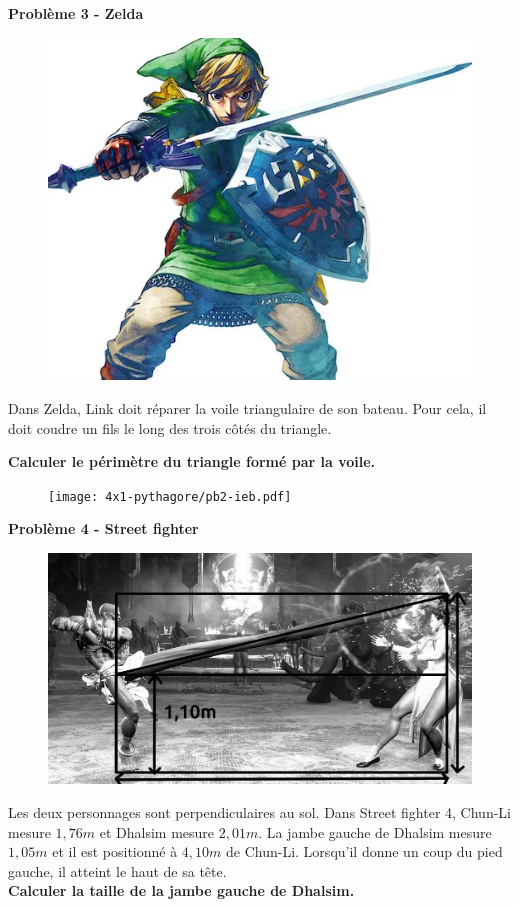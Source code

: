 \begin{multicols}{2} 
  \textbf{Problème 3 - Zelda} \\

  \begin{figure}[H]
    \centering
    \includegraphics[width=0.5\linewidth]{4x1-pythagore/pb1-link.png}
  \end{figure}

  Dans Zelda, Link doit réparer la voile triangulaire de son bateau. Pour cela, il doit coudre un fils le long des trois côtés du triangle. 

  \textbf{Calculer le périmètre du triangle formé par la voile.} \columnbreak

  \begin{figure}[H]
    \centering
    \texttt{[image: 4x1-pythagore/pb2-ieb.pdf]}
  \end{figure}

\end{multicols}

\textbf{Problème 4 - Street fighter} \\

\begin{figure}[H]
  \centering
  \includegraphics[width=0.5\linewidth]{4x1-pythagore/sf4.jpg}
\end{figure}

Les deux personnages sont perpendiculaires au sol. Dans Street fighter 4, Chun-Li mesure $1,76m$ et Dhalsim mesure $2,01m$. La jambe gauche de Dhalsim mesure $1,05m$ et il est positionné à $4,10m$ de Chun-Li. Lorsqu'il donne un coup du pied gauche, il atteint le haut de sa tête. \\

\textbf{Calculer la taille de la jambe gauche de Dhalsim.} 

